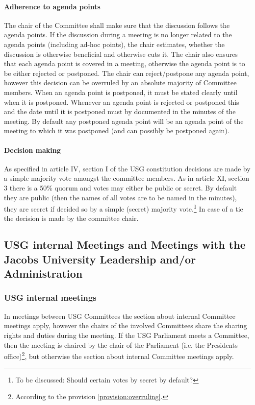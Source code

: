 \paragraph{Adherence to agenda points}
The chair of the Committee shall make sure that the discussion follows the agenda points. If the discussion during a meeting is no longer related to the agenda points (including ad-hoc points), the chair estimates, whether the discussion is otherwise beneficial and otherwise cuts it. 
The chair also ensures that each agenda point is covered in a meeting, otherwise the agenda point is to be either rejected or postponed. The chair can reject/postpone any agenda point, however this decision can be overruled by an absolute majority of Committee members. When an agenda point is postponed, it must be stated clearly until when it is postponed. Whenever an agenda point is rejected or postponed this and the date until it is postponed must by documented in the minutes of the meeting. By default any postponed agenda point will be an agenda point of the meeting to which it was postponed (and can possibly be postponed again). 


\paragraph{Decision making}
As specified in article IV, section I of the USG constitution decisions are made by a simple majority vote amongst the committee members. As in article XI, section 3 there is a 50\% quorum and votes may either be public or secret. By default they are public (then the names of all votes are to be named in the minutes), they are secret if decided so by a simple (secret) majority vote.\protect\footnote{To be discussed: Should certain votes by secret by default?} In case of a tie the decision is made by the committee chair.

\subsection[Non-internal Meetings]{USG internal Meetings and Meetings with the Jacobs University Leadership and/or Administration}
\subsubsection{USG internal meetings}
  In meetings between USG Committees the section about internal Committee meetings apply, however the chairs of the involved Committees share the sharing rights and duties during the meeting.
  If the USG Parliament meets a Committee, then the meeting is chaired by the chair of the Parliament (i.e. the Presidents office)\protect\footnote{According to the provision \ref{provision:overruling}.}, but otherwise the section about internal Committee meetings apply.
